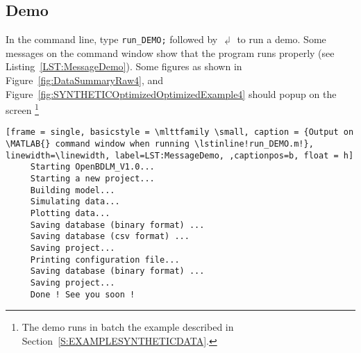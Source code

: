 \subsection{Demo}

In the \MATLAB{} command line, type  
\colorbox{light-gray}{\lstinline[basicstyle = \mlttfamily \small, backgroundcolor = \color{light-gray}]!run_DEMO;! }
 followed by $\dlsh$ to run a demo. 
Some messages on the \MATLAB{} command window show that the program runs properly (see Listing~\ref{LST:MessageDemo}).
Some figures as shown in Figure~\ref{fig:DataSummaryRaw4}, and Figure~\ref{fig:SYNTHETICOptimizedOptimizedExample4} should popup on the screen \footnote{The demo runs in batch the example described in Section~\ref{S:EXAMPLESYNTHETICDATA}.}


\begin{lstlisting}[frame = single, basicstyle = \mlttfamily \small, caption = {Output on \MATLAB{} command window when running \lstinline!run_DEMO.m!}, linewidth=\linewidth, label=LST:MessageDemo, ,captionpos=b, float = h] 
     Starting OpenBDLM_V1.0...
     Starting a new project...
     Building model...
     Simulating data...
     Plotting data...
     Saving database (binary format) ...
     Saving database (csv format) ...
     Saving project...
     Printing configuration file...
     Saving database (binary format) ...
     Saving project...
     Done ! See you soon !
\end{lstlisting}